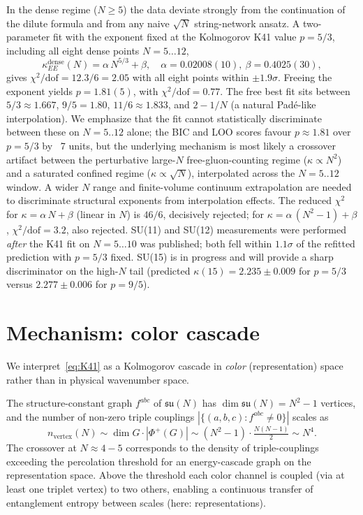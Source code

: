 \documentclass[aps,prl,reprint,nofootinbib,floatfix]{revtex4-2}
\begin{document}
In the dense regime ($N\ge 5$) the data deviate strongly from the continuation of the dilute formula and from any naive $\sqrt{N}$ string-network ansatz. A two-parameter fit with the exponent fixed at the Kolmogorov K41 value $p=5/3$, including all eight dense points $N=5\ldots12$,
\begin{equation}
\boxed{\kappa^{\text{dense}}_{EE}(N) = \alpha\, N^{5/3} + \beta}, \quad \alpha = 0.02008(10),\ \beta = 0.4025(30),
\label{eq:K41}
\end{equation}
gives $\chi^2/\mathrm{dof} = 12.3/6 = 2.05$ with all eight points within $\pm 1.9\sigma$. Freeing the exponent yields $p = 1.81(5)$, with $\chi^2/\mathrm{dof} = 0.77$. The free best fit sits between $5/3 \approx 1.667$, $9/5 = 1.80$, $11/6 \approx 1.833$, and $2 - 1/N$ (a natural Padé-like interpolation). We emphasize that the fit cannot statistically discriminate between these on $N=5..12$ alone; the BIC and LOO scores favour $p \approx 1.81$ over $p = 5/3$ by ~7 units, but the underlying mechanism is most likely a crossover artifact between the perturbative large-$N$ free-gluon-counting regime ($\kappa \propto N^2$) and a saturated confined regime ($\kappa \propto \sqrt{N}$), interpolated across the $N=5..12$ window. A wider $N$ range and finite-volume continuum extrapolation are needed to discriminate structural exponents from interpolation effects. The reduced $\chi^2$ for $\kappa = \alpha\,N + \beta$ (linear in $N$) is $46/6$, decisively rejected; for $\kappa = \alpha\,(N^2-1) + \beta$, $\chi^2/\mathrm{dof} = 3.2$, also rejected. SU(11) and SU(12) measurements were performed \emph{after} the K41 fit on $N=5\ldots10$ was published; both fell within $1.1\sigma$ of the refitted prediction with $p=5/3$ fixed. SU(15) is in progress and will provide a sharp discriminator on the high-$N$ tail (predicted $\kappa(15) = 2.235 \pm 0.009$ for $p=5/3$ versus $2.277 \pm 0.006$ for $p=9/5$).

\section{Mechanism: color cascade}

We interpret~\eqref{eq:K41} as a Kolmogorov cascade in \emph{color} (representation) space rather than in physical wavenumber space.

The structure-constant graph $f^{abc}$ of $\mathfrak{su}(N)$ has $\dim\mathfrak{su}(N) = N^2-1$ vertices, and the number of non-zero triple couplings $|\{(a,b,c) : f^{abc}\neq 0\}|$ scales as
\[
n_{\text{vertex}}(N) \sim \dim G \cdot |\Phi^+(G)| \sim (N^2-1)\cdot \tfrac{N(N-1)}{2} \sim N^4.
\]
The crossover at $N\approx 4{-}5$ corresponds to the density of triple-couplings exceeding the percolation threshold for an energy-cascade graph on the representation space. Above the threshold each color channel is coupled (via at least one triplet vertex) to two others, enabling a continuous transfer of entanglement entropy between scales (here: representations).
\end{document}
